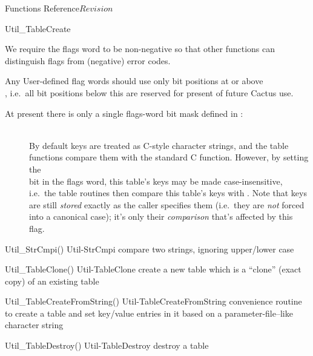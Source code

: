 \begin{cactuspart}{ Functions Reference}{}{$Revision$}
\begin{FunctionDescription}{Util\_TableCreate}
\begin{Discussion}
We require the flags word to be non-negative so that other
functions can distinguish flags from (negative) error codes.

Any User-defined flag words should use only bit positions at or above\\
, i.e.\ all bit positions
below this are reserved for present of future Cactus use.

At present there is only a single flags-word bit mask defined
in :
\begin{description}
\item[]\mbox{}\\
        By default keys are treated as C-style character strings,
        and the table functions compare them with the standard C
         function.
        However, by setting the\\
        bit in the flags word, this table's keys may be made
        case-insensitive, i.e.\ the table routines then compare
        this table's keys with .
        Note that keys are still {\em stored\/} exactly as
        the caller specifies them (i.e.\ they are {\em not\/}
        forced into a canonical case); it's only their
        {\em comparison\/} that's affected by this flag.
\end{description}
\end{Discussion}

\begin{SeeAlsoSection}
\begin{SeeAlso2} {Util\_StrCmpi()} {Util-StrCmpi}
compare two strings, ignoring upper/lower case
\end{SeeAlso2}
\begin{SeeAlso2} {Util\_TableClone()} {Util-TableClone}
create a new table which is a ``clone'' (exact copy) of an existing
table
\end{SeeAlso2}
\begin{SeeAlso2} {Util\_TableCreateFromString()} {Util-TableCreateFromString}
convenience routine to create a table and set key/value entries
in it based on a parameter-file--like character string
\end{SeeAlso2}
\begin{SeeAlso2} {Util\_TableDestroy()} {Util-TableDestroy}
destroy a table
\end{SeeAlso2}
\end{SeeAlsoSection}


\end{FunctionDescription}
\end{cactuspart}
